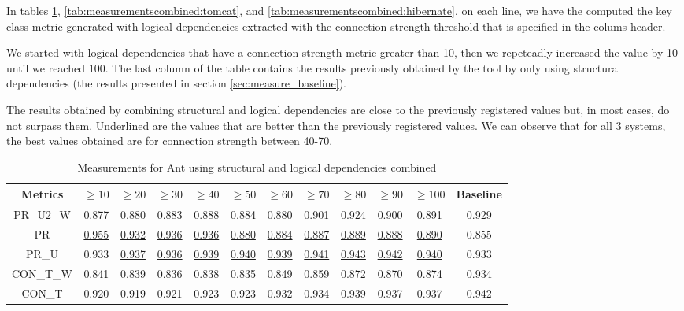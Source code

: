 \documentclass[runningheads]{comsis2}
\begin{document}
In tables \ref{tab:measurementscombined:ant}, \ref{tab:measurementscombined:tomcat}, and \ref{tab:measurementscombined:hibernate}, on each line, we have the computed the key class metric generated with logical dependencies extracted with the connection strength threshold that is specified in the colums header.

We started with logical dependencies that have a connection strength metric greater than 10, then we repeteadly increased the value by 10 until we reached 100. The last column of the table contains the results previously obtained by the tool by only using structural dependencies (the results presented in section \ref{sec:measure_baseline}).


The results obtained by combining structural and logical dependencies are close to the previously registered values but, in most cases, do not surpass them. Underlined are the values that are better than the previously registered values. We can observe that for all 3 systems, the best values obtained are for connection strength between 40-70.

\begin{table}[!h]
\setlength\tabcolsep{3.5pt}
\caption{Measurements for Ant using structural and logical dependencies combined}
\label{tab:measurementscombined:ant}
\centering
\begin{tabular}{|c|cccccccccc|c|}
\hline
Metrics &	$\geq10$	&	$\geq20$		&	$\geq30$		&	$\geq40$		&	$\geq50$		&	$\geq60$		&	$\geq70$		&	$\geq80$		&	$\geq90$		&	$\geq100$		&	Baseline \\
\hline

PR\_U2\_W	&	0.877	&	0.880	&	0.883	&	0.888	&	0.884	&	0.880	&	0.901	&	0.924	&	0.900	&	0.891	&	0.929	\\
PR	&	\underline{0.955}	&	\underline{0.932}	&	\underline{0.936}	&	\underline{0.936}	&	\underline{0.880}	&	\underline{0.884}	&	\underline{0.887}	&	\underline{0.889}	&	\underline{0.888}	&	\underline{0.890}	&	0.855	\\
PR\_U	&	0.933	&	\underline{0.937}	&	\underline{0.936}	&	\underline{0.939}	&	\underline{0.940}	&	\underline{0.939}	&	\underline{0.941}	&	\underline{0.943}	&	\underline{0.942}	&	\underline{0.940}	&	0.933	\\
CON\_T\_W	&	0.841	&	0.839	&	0.836	&	0.838	&	0.835	&	0.849	&	0.859	&	0.872	&	0.870	&	0.874	&	0.934	\\
CON\_T	&	0.920	&	0.919	&	0.921	&	0.923	&	0.923	&	0.932	&	0.934	&	0.939	&	0.937	&	0.937	&	0.942	\\

\hline
\end{tabular}
\end{table}
\end{document}

